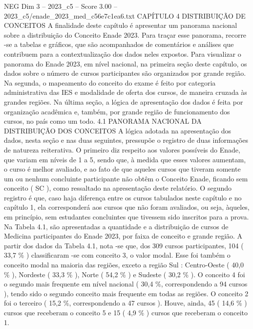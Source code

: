 \begin{textsample}{NEG Dim 3 – 2023\_c5 – Score 3.00 – 2023\_c5/enade\_2023\_med\_c56e7c1ea6.txt}  \label{ex:f3_neg_228}
CAPÍTULO 4 DISTRIBUIÇÃO DE CONCEITOS A finalidade deste capítulo é apresentar um panorama nacional sobre a distribuição do Conceito Enade 2023.
Para traçar esse panorama, recorre -se a tabelas e gráficos, que são acompanhados de comentários e análises que contribuem para a contextualização dos dados neles expostos.
Para visualizar o panorama do Enade 2023, em nível nacional, na primeira seção deste capítulo, os dados sobre o número de cursos participantes são organizados por grande região.
Na segunda, o mapeamento do conceito do exame é feito por categoria administrativa das IES e modalidade de oferta dos cursos, de maneira cruzada às grandes regiões.
Na última seção, a lógica de apresentação dos dados é feita por organização acadêmica e, também, por grande região de funcionamento dos cursos, no país como um todo. 4.1 PANORAMA NACIONAL DA DISTRIBUIÇÃO DOS CONCEITOS A lógica adotada na apresentação dos dados, nesta seção e nas duas seguintes, pressupõe o registro de duas informações de natureza reiterativa.
O primeiro diz respeito aos valores possíveis do Enade, que variam em níveis de 1 a 5, sendo que, à medida que esses valores aumentam, o curso é melhor avaliado, e ao fato de que aqueles cursos que tiveram somente um ou nenhum concluinte participante não obtêm o Conceito Enade, ficando sem conceito ( SC ), como ressaltado na apresentação deste relatório.
O segundo registro é que, caso haja diferença entre os cursos tabulados neste capítulo e no capítulo 1, ela corresponderá aos cursos que não foram avaliados, ou seja, àqueles, em princípio, sem estudantes concluintes que tivessem sido inscritos para a prova.
Na Tabela 4.1, são apresentadas a quantidade e a distribuição de cursos de Medicina participantes do Enade 2023, por faixa de conceito e grande região.
A partir dos dados da Tabela 4.1, nota -se que, dos 309 cursos participantes, 104 ( 33,7 \% ) classificaram -se com conceito 3, o valor modal.
Esse foi também o conceito modal na maioria das regiões, exceto a região Sul : Centro-Oeste ( 40,0 \% ), Nordeste ( 33,3 \% ), Norte ( 54,2 \% ) e Sudeste ( 30,2 \% ).
O conceito 4 foi o segundo mais frequente em nível nacional ( 30,4 \%, correspondendo a 94 cursos ), tendo sido o segundo conceito mais frequente em todas as regiões.
O conceito 2 foi o terceiro ( 15,2 \%, correspondendo a 47 cursos ).
Houve, ainda, 45 ( 14,6 \% ) cursos que receberam o conceito 5 e 15 ( 4,9 \% ) cursos que receberam o conceito 1.

\end{textsample}
